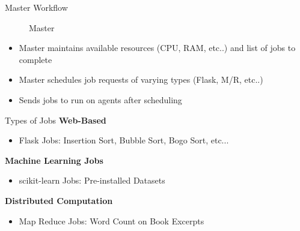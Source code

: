 \documentclass[unknownkeysallowed, final]{beamer}
\begin{document}
\begin{frame}
\begin{columns}[t]
\begin{column}{.34\linewidth}
\begin{block}{Master Workflow}
\begin{figure}
		    \caption{Master}
		    \label{fig:master}
		\end{figure}
	\begin{itemize}
        \item Master maintains available resources (CPU, RAM, etc..) and list of jobs to complete
        \item Master schedules job requests of varying types (Flask, M/R, etc..) 
        \item Sends jobs to run on agents after scheduling
    \end{itemize}
\end{block}
\vspace{.5cm}
\begin{block}{Types of Jobs}
\textbf{Web-Based}
\begin{itemize}
    \item Flask Jobs: Insertion Sort, Bubble Sort, Bogo Sort, etc...
\end{itemize}
\vspace{.3cm}
\textbf{Machine Learning Jobs}
\begin{itemize}
    \item scikit-learn Jobs: Pre-installed Datasets
\end{itemize}
\vspace{.3cm}
\textbf{Distributed Computation}
\begin{itemize}
    \item Map Reduce Jobs: Word Count on Book Excerpts
\end{itemize}
\end{block}


\end{column}
\end{columns}
\end{frame}
\end{document}
